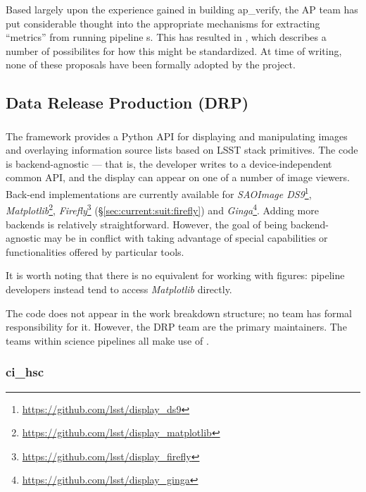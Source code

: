 \documentclass[DM,authoryear,toc,lsstdraft]{lsstdoc}
\begin{document}
Based largely upon the experience gained in building ap\_verify, the AP team
has put considerable thought into the appropriate mechanisms for extracting
``metrics'' from running pipeline s. This has resulted in
, which describes a number of possibilites for how this might
be standardized. At time of writing, none of these proposals have been
formally adopted by the project.

\subsection{Data Release Production (DRP)}
\label{sec:current:drp}

\subsubsection{}
\label{sec:current:drp:afwDisplay}

The  framework provides a Python API for displaying and
manipulating images and overlaying information source lists based on LSST
stack primitives. The code is backend-agnostic --- that is, the developer
writes to a device-independent common API, and the display can appear on one
of a number of image viewers. Back-end implementations are currently available
for \textit{SAOImage DS9}\footnote{\url{https://github.com/lsst/display_ds9}},
\textit{Matplotlib}\footnote{\url{https://github.com/lsst/display_matplotlib}},
\textit{Firefly}\footnote{\url{https://github.com/lsst/display_firefly}}
(\S\ref{sec:current:suit:firefly}) and
\textit{Ginga}\footnote{\url{https://github.com/lsst/display_ginga}}. Adding
more backends is relatively straightforward. However, the goal of being
backend-agnostic may be in conflict with taking advantage of special
capabilities or functionalities offered by particular tools.

It is worth noting that there is no  equivalent for working
with figures: pipeline developers instead tend to access \textit{Matplotlib}
directly.

The  code does not appear in the work breakdown structure; no
team has formal responsibility for it. However, the DRP team are the primary
maintainers. The teams within science pipelines all make use of .

\subsubsection{ci\_hsc}
\label{sec:current:drp:cihsc}
\end{document}
